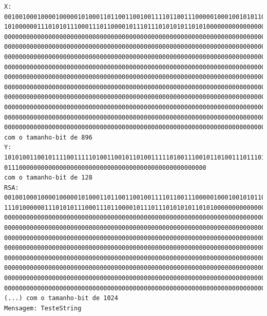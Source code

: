 \documentclass[12pt]{report}
\begin{document}
    \begin{Verbatim}[commandchars=\\\{\}]
X: 0010010001000010000010100011011001100100111101100111000001000100101011011
101000000111010101110001110110000101110111010101011010100000000000000000000
000000000000000000000000000000000000000000000000000000000000000000000000000
000000000000000000000000000000000000000000000000000000000000000000000000000
000000000000000000000000000000000000000000000000000000000000000000000000000
000000000000000000000000000000000000000000000000000000000000000000000000000
000000000000000000000000000000000000000000000000000000000000000000000000000
000000000000000000000000000000000000000000000000000000000000000000000000000
000000000000000000000000000000000000000000000000000000000000000000000000000
000000000000000000000000000000000000000000000000000000000000000000000000000
000000000000000000000000000000000000000000000000000000000000000000000000000
0000000000000000000000000000000000000000000000000000000000000000000000000 
com o tamanho-bit de 896
Y: 1010100110010111100111110100110010110100111110100111001011010011101110110
0111000000000000000000000000000000000000000000000000000 
com o tamanho-bit de 128
RSA: 00100100010000100000101000110110011001001111011001110000010001001010110
1110100000011101010111000111011000010111011101010101101010000000000000000000
0000000000000000000000000000000000000000000000000000000000000000000000000000
0000000000000000000000000000000000000000000000000000000000000000000000000000
0000000000000000000000000000000000000000000000000000000000000000000000000000
0000000000000000000000000000000000000000000000000000000000000000000000000000
0000000000000000000000000000000000000000000000000000000000000000000000000000
0000000000000000000000000000000000000000000000000000000000000000000000000000
0000000000000000000000000000000000000000000000000000000000000000000000000000
0000000000000000000000000000000000000000000000000000000000000000000000000000
(...) com o tamanho-bit de 1024
Mensagem: TesteString

    \end{Verbatim}
\end{document}
